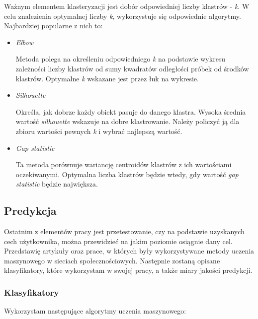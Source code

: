 \documentclass[polish,12pt]{aghthesis}
\begin{document}
Ważnym elementem klasteryzacji jest dobór odpowiedniej liczby klastrów - \textit{k}. W celu znalezienia optymalnej liczby \textit{k}, wykorzystuje się odpowiednie algorytmy. Najbardziej popularne z nich to:
\begin{itemize}
    \item \textit{Elbow}\cite{elbow}
    
    Metoda polega na określeniu odpowiedniego \textit{k} na podstawie wykresu zależności liczby klastrów od sumy kwadratów odległości próbek od środków klastrów. Optymalne \textit{k} wskazane jest przez łuk na wykresie.
    \item \textit{Silhouette} \cite{Silhouette}
    
    Określa, jak dobrze każdy obiekt pasuje do danego klastra. Wysoka średnia wartość \textit{silhouette} wskazuje na dobre klastrowanie. Należy policzyć ją dla zbioru wartości pewnych \textit{k} i wybrać najlepszą wartość.
    \item \textit{Gap statistic}\cite{gap}
    
    Ta metoda porównuje wariancję centroidów klastrów z ich wartościami oczekiwanymi. Optymalna liczba klastrów będzie wtedy, gdy wartość \textit{gap statistic} będzie największa.
\end{itemize}


\subsection{Predykcja}

Ostatnim z elementów pracy jest przetestowanie, czy na podstawie uzyskanych cech użytkownika, można przewidzieć na jakim poziomie osiągnie dany cel. Przedstawię artykuły oraz prace, w których były wykorzystywane metody uczenia maszynowego w sieciach społecznościowych. Następnie zostaną opisane klasyfikatory, które wykorzystam w swojej pracy, a także miary jakości predykcji.



\subsubsection{Klasyfikatory}
Wykorzystam następujące algorytmy uczenia maszynowego:
\end{document}
